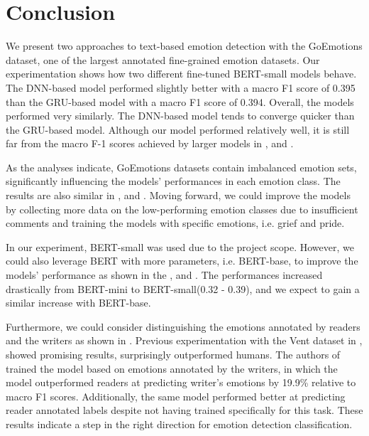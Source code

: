 \documentclass[conference]{IEEEtran}
\begin{document}
\section{Conclusion}

We present two approaches to text-based emotion detection with the GoEmotions dataset\cite{DBLP:journals/corr/abs-2005-00547}, one of the largest annotated fine-grained emotion datasets. Our experimentation shows how two different fine-tuned BERT-small\cite{bhargava2021generalization}\cite{DBLP:journals/corr/abs-1908-08962} models behave. The DNN-based model performed slightly better with a macro F1 score of 0.395 than the GRU-based model with a macro F1 score of 0.394. Overall, the models performed very similarly. The DNN-based model tends to converge quicker than the GRU-based model. Although our model performed relatively well, it is still far from the macro F-1 scores achieved by larger models in \cite{DBLP:journals/corr/abs-2005-00547}, and \cite{https://doi.org/10.48550/arxiv.2109.01900}.

As the analyses indicate, GoEmotions datasets contain imbalanced emotion sets, significantly influencing the models' performances in each emotion class. The results are also similar in \cite{DBLP:journals/corr/abs-2005-00547}, and \cite{https://doi.org/10.48550/arxiv.2109.01900}. Moving forward, we could improve the models by collecting more data on the low-performing emotion classes due to insufficient comments and training the models with specific emotions, i.e. grief and pride.

In our experiment, BERT-small was used due to the project scope. However, we could also leverage BERT with more parameters, i.e. BERT-base, to improve the models' performance as shown in the \cite{DBLP:journals/corr/abs-2005-00547}, and \cite{https://doi.org/10.48550/arxiv.2109.01900}. The performances increased drastically from BERT-mini to BERT-small(0.32 - 0.39), and we expect to gain a similar increase with BERT-base\cite{DBLP:journals/corr/abs-1908-08962}.

Furthermore, we could consider distinguishing the emotions annotated by readers and the writers as shown in \cite{https://doi.org/10.48550/arxiv.2109.01900}.
Previous experimentation with the Vent\cite{DBLP:journals/corr/abs-1901-04856} dataset in \cite{https://doi.org/10.48550/arxiv.2109.01900}, showed promising results, surprisingly outperformed humans. The authors of \cite {https://doi.org/10.48550/arxiv.2109.01900} trained the model based on emotions annotated by the writers, in which the model outperformed readers at predicting writer's emotions by 19.9\% relative to macro F1 scores. Additionally, the same model performed better at predicting reader annotated labels despite not having trained specifically for this task. These results indicate a step in the right direction for emotion detection classification. 
{}

\end{document}
